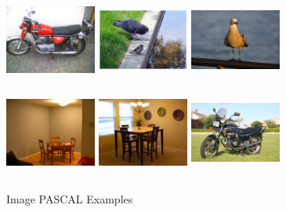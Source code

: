 \vspace*{1cm}
\begin{center}
\begin{figure}
\centering
\includegraphics[width=3cm, height=3cm]{./Pictures/PASCAL/1.jpg}
\includegraphics[width=3cm, height=3cm]{./Pictures/PASCAL/2.jpg}
\includegraphics[width=3cm, height=3cm]{./Pictures/PASCAL/3.jpg} \\
\includegraphics[width=3cm, height=3cm]{./Pictures/PASCAL/4.jpg}
\includegraphics[width=3cm, height=3cm]{./Pictures/PASCAL/5.jpg}
\includegraphics[width=3cm, height=3cm]{./Pictures/PASCAL/6.jpg}
\caption{Image PASCAL Examples}
\label{fig:Image PASCAL Examples}
\end{figure}
\end{center}
